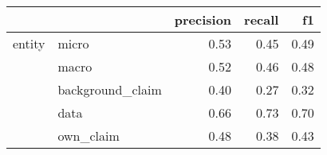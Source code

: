 \begin{tabular}{llrrr}
\toprule
       &           &  precision &  recall &   f1 \\
\midrule
entity & micro &       0.53 &    0.45 & 0.49 \\
       & macro &       0.52 &    0.46 & 0.48 \\
       & background\_claim &       0.40 &    0.27 & 0.32 \\
       & data &       0.66 &    0.73 & 0.70 \\
       & own\_claim &       0.48 &    0.38 & 0.43 \\
\bottomrule
\end{tabular}
